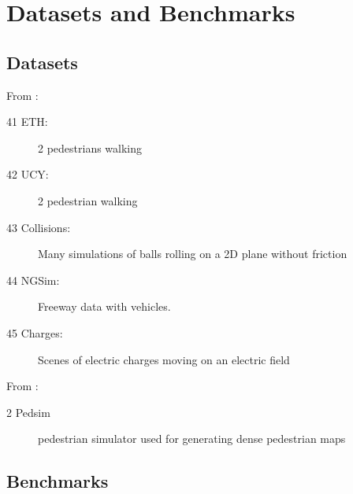 \section{Datasets and Benchmarks}\label{sec: datasets and benchmarks}

\subsection{Datasets}

From \cite{xu2021tra2tra}: 
\begin{description}
	\item[41 ETH:] 2 pedestrians walking
	\item[42 UCY:] 2 pedestrian walking
	\item[43 Collisions:] Many simulations of balls rolling on a 2D plane without friction 
	\item[44 NGSim:] Freeway data with vehicles.
	\item[45 Charges:] Scenes of electric charges moving on an electric field
\end{description}

From \cite{kiss2021probabilistic}:
\begin{description}
	\item[2 Pedsim] pedestrian simulator used for generating dense pedestrian maps
\end{description}

\subsection{Benchmarks}